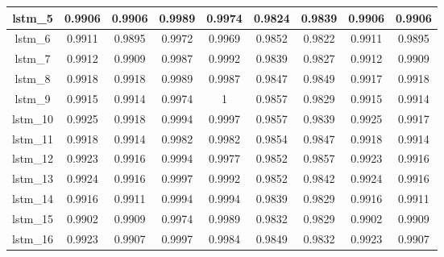 \begin{table}[p]
\begin{tabular} {|c|c|c|c|c|c|c|c|c| }
        lstm\_5  & 0.9906                        & 0.9906                         & 0.9989                      & 0.9974                  & 0.9824 & 0.9839 & 0.9906 & 0.9906 \\ \hline
        lstm\_6  & 0.9911                        & 0.9895                         & 0.9972                      & 0.9969                  & 0.9852 & 0.9822 & 0.9911 & 0.9895 \\ \hline
        lstm\_7  & 0.9912                        & 0.9909                         & 0.9987                      & 0.9992                  & 0.9839 & 0.9827 & 0.9912 & 0.9909 \\ \hline
        lstm\_8  & 0.9918                        & 0.9918                         & 0.9989                      & 0.9987                  & 0.9847 & 0.9849 & 0.9917 & 0.9918 \\ \hline
        lstm\_9  & 0.9915                        & 0.9914                         & 0.9974                      & 1                       & 0.9857 & 0.9829 & 0.9915 & 0.9914 \\ \hline
        lstm\_10 & 0.9925                        & 0.9918                         & 0.9994                      & 0.9997                  & 0.9857 & 0.9839 & 0.9925 & 0.9917 \\ \hline
        lstm\_11 & 0.9918                        & 0.9914                         & 0.9982                      & 0.9982                  & 0.9854 & 0.9847 & 0.9918 & 0.9914 \\ \hline
        lstm\_12 & 0.9923                        & 0.9916                         & 0.9994                      & 0.9977                  & 0.9852 & 0.9857 & 0.9923 & 0.9916 \\ \hline
        lstm\_13 & 0.9924                        & 0.9916                         & 0.9997                      & 0.9992                  & 0.9852 & 0.9842 & 0.9924 & 0.9916 \\ \hline
        lstm\_14 & 0.9916                        & 0.9911                         & 0.9994                      & 0.9994                  & 0.9839 & 0.9829 & 0.9916 & 0.9911 \\ \hline
        lstm\_15 & 0.9902                        & 0.9909                         & 0.9974                      & 0.9989                  & 0.9832 & 0.9829 & 0.9902 & 0.9909 \\ \hline
        lstm\_16 & 0.9923                        & 0.9907                         & 0.9997                      & 0.9984                  & 0.9849 & 0.9832 & 0.9923 & 0.9907 \\ \hline

\end{tabular}
\end{table}
